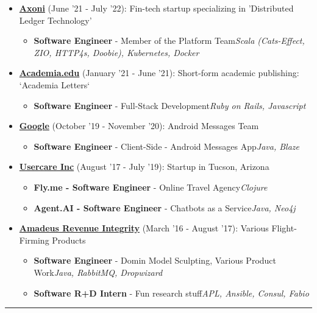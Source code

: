 \documentclass{article}
\begin{document}
\begin{itemize}
\item \href{https://axoni.com}{\textbf{Axoni}} {(June '21 - July '22)}: Fin-tech startup specializing in 'Distributed Ledger Technology' 
\begin{itemize}
\item \textbf{Software Engineer} - Member of the Platform Team\newline \textit{Scala (Cats-Effect, ZIO, HTTP4s, Doobie), Kubernetes, Docker}
\end{itemize}
\item \href{https://academia.edu}{\textbf{Academia.edu}} {(January '21 - June '21)}: Short-form academic publishing: `Academia Letters` 
\begin{itemize}
\item \textbf{Software Engineer} - Full-Stack Development\newline \textit{Ruby on Rails, Javascript}
\end{itemize}
\item \href{https://google.com}{\textbf{Google}} {(October '19 - November '20)}: Android Messages Team 
\begin{itemize}
\item \textbf{Software Engineer} - Client-Side - Android Messages App\newline \textit{Java, Blaze}
\end{itemize}
\item \href{https://www.crunchbase.com/organization/usercare}{\textbf{Usercare Inc}} {(August '17 - July '19)}: Startup in Tucson, Arizona 
\begin{itemize}
\item \textbf{Fly.me - Software Engineer} - Online Travel Agency\newline \textit{Clojure}
\item \textbf{Agent.AI - Software Engineer} - Chatbots as a Service\newline \textit{Java, Neo4j}
\end{itemize}
\item \href{https://amadeus.com/en/portfolio/airlines/revenue-integrity}{\textbf{Amadeus Revenue Integrity}} {(March '16 - August '17)}: Various Flight-Firming Products 
\begin{itemize}
\item \textbf{Software Engineer} - Domin Model Sculpting, Various Product Work\newline \textit{Java, RabbitMQ, Dropwizard}
\item \textbf{Software R+D Intern} - Fun research stuff\newline \textit{APL, Ansible, Consul, Fabio}
\end{itemize}
\end{itemize}
\noindent\rule{\linewidth}{1pt}
\end{document}
